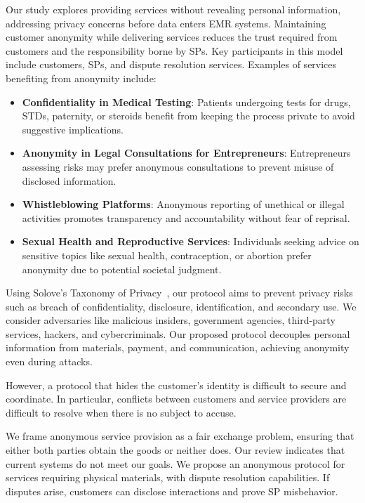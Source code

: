 \documentclass[pdftex,twocolumn,epjc3]{svjour3}
\begin{document}
\begin{sloppypar}
Our study explores providing services without revealing personal information, addressing privacy concerns before data enters EMR systems. Maintaining customer anonymity while delivering services reduces the trust required from customers and the responsibility borne by SPs. Key participants in this model include customers, SPs, and dispute resolution services. Examples of services benefiting from anonymity include:
\begin{itemize}
  \item \textbf{Confidentiality in Medical Testing}: Patients undergoing tests for drugs, STDs, paternity, or steroids benefit from keeping the process private to avoid suggestive implications.
  \item \textbf{Anonymity in Legal Consultations for Entrepreneurs}: Entrepreneurs assessing risks may prefer anonymous consultations to prevent misuse of disclosed information.
  \item \textbf{Whistleblowing Platforms}: Anonymous reporting of unethical or illegal activities promotes transparency and accountability without fear of reprisal.
  \item \textbf{Sexual Health and Reproductive Services}: Individuals seeking advice on sensitive topics like sexual health, contraception, or abortion prefer anonymity due to potential societal judgment.
\end{itemize}
\end{sloppypar}

\begin{sloppypar}
Using Solove's Taxonomy of Privacy~\cite{soloveTaxonomyPrivacy2006}, our protocol aims to prevent privacy risks such as breach of confidentiality, disclosure, identification, and secondary use. We consider adversaries like malicious insiders, government agencies, third-party services, hackers, and cybercriminals. Our proposed protocol decouples personal information from materials, payment, and communication, achieving anonymity even during attacks.
\end{sloppypar}

\begin{sloppypar}
However, a protocol that hides the customer's identity is difficult to secure and coordinate. In particular, conflicts between customers and service providers are difficult to resolve when there is no subject to accuse.
\end{sloppypar}

\begin{sloppypar}
We frame anonymous service provision as a fair exchange problem, ensuring that either both parties obtain the goods or neither does. Our review indicates that current systems do not meet our goals. We propose an anonymous protocol for services requiring physical materials, with dispute resolution capabilities. If disputes arise, customers can disclose interactions and prove SP misbehavior.
\end{sloppypar}
\end{document}
